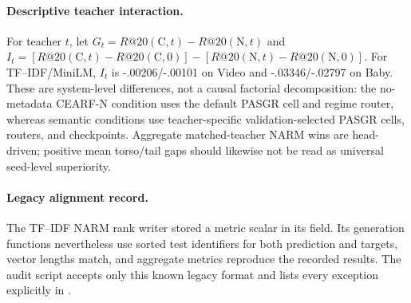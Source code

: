 \documentclass[runningheads]{llncs}
\newcommand{\method}{CEARF-N}
\begin{document}
\paragraph{Descriptive teacher interaction.}
For teacher $t$, let $G_t=R@20(\mathrm C,t)-R@20(\mathrm N,t)$ and
$I_t=[R@20(\mathrm C,t)-R@20(\mathrm C,0)]
-[R@20(\mathrm N,t)-R@20(\mathrm N,0)]$. For TF--IDF/MiniLM,
$I_t$ is -.00206/-.00101 on Video and -.03346/-.02797 on Baby.
These are system-level differences, not a causal factorial decomposition:
the no-metadata \method{} condition uses the default PASGR cell and regime
router, whereas semantic conditions use teacher-specific
validation-selected PASGR cells, routers, and checkpoints. Aggregate
matched-teacher NARM wins are head-driven; positive mean torso/tail gaps
should likewise not be read as universal seed-level superiority.

\paragraph{Legacy alignment record.}
The TF--IDF NARM rank writer stored a metric scalar in its
 field. Its generation functions nevertheless use
sorted test identifiers for both prediction and targets, vector lengths
match, and aggregate metrics reproduce the recorded results. The audit script
accepts only this known legacy format and lists every exception explicitly in
.
\end{document}
